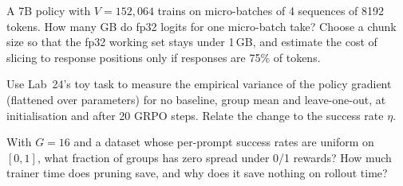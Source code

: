 \begin{exercise}
A 7B policy with $V=152{,}064$ trains on micro-batches of 4 sequences of 8192 tokens. How many
GB do fp32 logits for one micro-batch take? Choose a chunk size so that the fp32 working set
stays under 1\,GB, and estimate the cost of slicing to response positions only if responses are
75\% of tokens.
\end{exercise}

\begin{exercise}
Use Lab~24's toy task to measure the empirical variance of the policy gradient (flattened over
parameters) for no baseline, group mean and leave-one-out, at initialisation and after 20
GRPO steps. Relate the change to the success rate $\eta$.
\end{exercise}

\begin{exercise}
With $G=16$ and a dataset whose per-prompt success rates are uniform on $[0,1]$, what fraction
of groups has zero spread under 0/1 rewards? How much trainer time does pruning save, and why does
it save nothing on rollout time?
\end{exercise}


